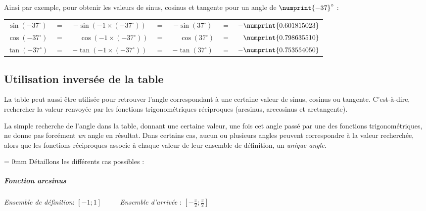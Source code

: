 \documentclass[a4paper]{article}
\begin{document}
			\vspace{4 mm}

			{ \parindent=0cm Ainsi par exemple, pour obtenir les valeurs de sinus, cosinus et tangente pour un angle de $\numprint{-37}^\circ$ :}

			\vspace{1 mm}

			\begin{tabular}{ccccccc}
				$\sin(-37^\circ)$&$=$&$-\sin(-1 \times (-37^\circ))$& $=$ & $-\sin(37^\circ)$           & $=$ & $-\numprint{0.601815023}$\\
				$\cos(-37^\circ)$&$=$&$\phantom{-}\cos(-1 \times (-37^\circ))$ & $=$ & $\phantom{-}\cos(37^\circ)$ & $=$ & $\phantom{-}\numprint{0.798635510}$\\
				$\tan(-37^\circ)$&$=$&$-\tan(-1 \times (-37^\circ))$& $=$ & $-\tan(37^\circ)$           & $=$ & $-\numprint{0.753554050}$\\
			\end{tabular}

		\subsection{Utilisation inversée de la table}

			La table peut aussi être utilisée pour retrouver l'angle correspondant à une certaine valeur de sinus, cosinus ou tangente.
			C'est-à-dire, rechercher la valeur renvoyée par les fonctions trigonométriques réciproques (arcsinus, arccosinus et arctangente).

			\vspace{2 mm}

			La simple recherche de l'angle dans la table, donnant une certaine valeur,
			une fois cet angle passé par une des fonctions trigonométriques, ne donne pas forcément \emph{un} angle en résultat.
			Dans certains cas, aucun ou plusieurs angles peuvent correspondre à la valeur recherchée, 
			alors que les fonctions réciproques associe à chaque valeur de leur ensemble de définition, un \emph{unique angle}.

			\vspace{3 mm}

			{\parindent = 0mm Détaillons les différents cas possibles :}

				\vspace{-3 mm}

				\subparagraph*{Fonction arcsinus}
					\textit{Ensemble de définition}: $[-1;1]$ ~~~~	\textit{Ensemble d'arrivée} : $\left[-\frac{\pi}{2};\frac{\pi}{2}\right]$
\end{document}
